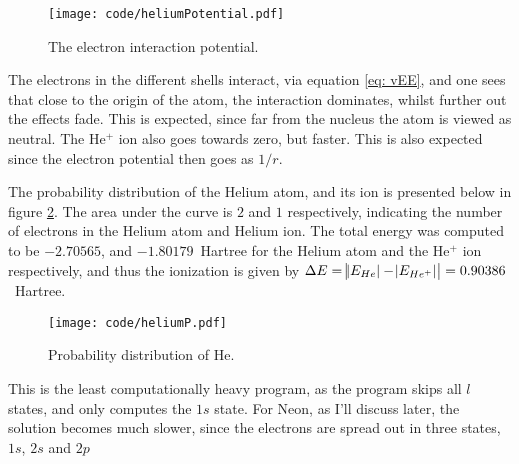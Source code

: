 \documentclass[a4paper]{article}
\newcommand{\newparagraph}{\vspace{.5cm}\noindent}
\begin{document}
\begin{figure}[H]
    \centering
    \texttt{[image: code/heliumPotential.pdf]}
    \caption{The electron interaction potential.}
    \label{fig: vEE He}
\end{figure}\noindent
The electrons in the different shells interact, via equation \eqref{eq: vEE}, and one sees that close to the origin of the atom, the interaction dominates, whilst further out the effects fade.
This is expected, since far from the nucleus the atom is viewed as neutral. The He$^+$ ion also goes towards zero, but faster. This is also expected since the electron potential then goes as $1/r$.

\newparagraph
The probability distribution of the Helium atom, and its ion is presented below in figure \ref{fig: prob dist He}. The area under the curve is $2$ and $1$ respectively, indicating the number of electrons in the Helium atom and Helium ion.
The total energy was computed to be $-2.70565$, and $-1.80179$~Hartree for the Helium atom and the He$^+$ ion respectively, and thus the ionization is given by $\Delta E = \abs{\abs{E_{He}} - \abs{E_{He^+}}} =  0.90386$~Hartree.
\begin{figure}[H]
    \centering
    \texttt{[image: code/heliumP.pdf]}
    \caption{Probability distribution of He.}
    \label{fig: prob dist He}
\end{figure}\noindent
This is the least computationally heavy program, as the program skips all $l$ states, and only computes the $1s$ state. For Neon, as I'll discuss later, the solution becomes much slower, since the electrons are spread out in three states, $1s$, $2s$ and $2p$
\end{document}
